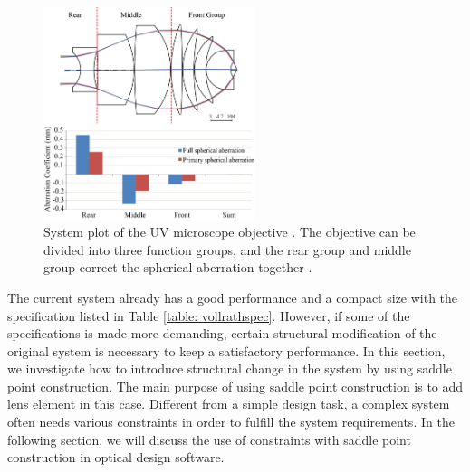 \begin{figure}[h!]
    \centering
    \includegraphics[width=0.55\textwidth]{chapter-4/figures/Vollrath_original.png}
    \caption{System plot of the UV microscope objective \cite{patentvollrath}. The objective can be divided into three function groups, and the rear group and middle group correct the spherical aberration together \cite{ZhangMicroscope2017}.}
    \label{fig: vollrathoriginal}
\end{figure}

The current system already has a good performance and a compact size with the specification listed in Table \ref{table: vollrathspec}. However, if some of the specifications is made more demanding, certain structural modification of the original system is necessary to keep a satisfactory performance. In this section, we investigate how to introduce structural change in the system by using saddle point construction. The main purpose of using saddle point construction is to add lens element in this case. Different from a simple design task, a complex system often needs various constraints in order to fulfill the system requirements. In the following section, we will discuss the use of constraints with saddle point construction in optical design software. 

